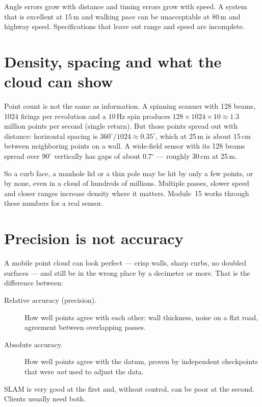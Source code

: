 \begin{bigidea}
Angle errors grow with distance and timing errors grow with speed. A system that is excellent at 15\,m and walking pace can be unacceptable at 80\,m and highway speed. Specifications that leave out range and speed are incomplete.
\end{bigidea}

\section{Density, spacing and what the cloud can show}

Point count is not the same as information. A spinning scanner with 128 beams, 1024 firings per revolution and a 10\,Hz spin produces $128 \times 1024 \times 10 \approx 1.3$ million points per second (single return). But those points spread out with distance: horizontal spacing is $360^\circ/1024 \approx 0.35^\circ$, which at 25\,m is about 15\,cm between neighboring points on a wall. A wide-field sensor with its 128 beams spread over $90^\circ$ vertically has gaps of about 0.7$^\circ$ --- roughly 30\,cm at 25\,m.

So a curb face, a manhole lid or a thin pole may be hit by only a few points, or by none, even in a cloud of hundreds of millions. Multiple passes, slower speed and closer ranges increase density where it matters. Module~15 works through these numbers for a real sensor.

\section{Precision is not accuracy}

A mobile point cloud can look perfect --- crisp walls, sharp curbs, no doubled surfaces --- and still be in the wrong place by a decimeter or more. That is the difference between:
\begin{description}
\item[Relative accuracy (precision).] How well points agree with each other: wall thickness, noise on a flat road, agreement between overlapping passes.
\item[Absolute accuracy.] How well points agree with the datum, proven by independent checkpoints that were \emph{not} used to adjust the data.
\end{description}
SLAM is very good at the first and, without control, can be poor at the second. Clients usually need both.

